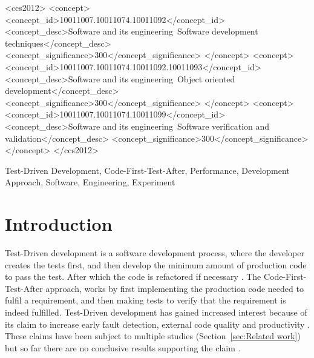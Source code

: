 \documentclass{sig-alternate-05-2015}
\begin{document}
%
%
\begin{CCSXML}
<ccs2012>
<concept>
<concept_id>10011007.10011074.10011092</concept_id>
<concept_desc>Software and its engineering~Software development techniques</concept_desc>
<concept_significance>300</concept_significance>
</concept>
<concept>
<concept_id>10011007.10011074.10011092.10011093</concept_id>
<concept_desc>Software and its engineering~Object oriented development</concept_desc>
<concept_significance>300</concept_significance>
</concept>
<concept>
<concept_id>10011007.10011074.10011099</concept_id>
<concept_desc>Software and its engineering~Software verification and validation</concept_desc>
<concept_significance>300</concept_significance>
</concept>
</ccs2012>
\end{CCSXML}



%
%

%
%
\printccsdesc

\begin{keywords}
Test-Driven Development, Code-First-Test-After, Performance, Development Approach, Software, Engineering, \newline Experiment
\end{keywords}

\section{Introduction}
Test-Driven development is a software development process, where the developer creates the tests first, and then develop the minimum amount of production code to pass the test. After which the code is refactored if necessary \cite{beck1}. The Code-First-Test-After approach, works by first implementing the production code needed to fulfil a requirement, and then making tests to verify that the requirement is indeed fulfilled. Test-Driven development has gained increased interest because of its claim to increase early fault detection, external code quality and productivity \cite{astels1}. These claims have been subject to multiple studies (Section~\ref{sec:Related work}) but so far there are no conclusive results supporting the claim \cite{shull1}.
\end{document}
